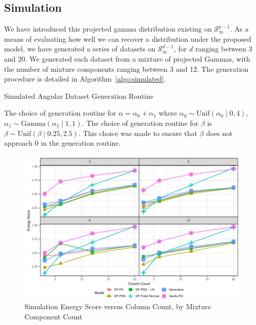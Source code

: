 \subsection{Simulation}
We have introduced this projected gamma distribution existing on $\mathcal{S}_{\infty}^{p-1}$.  As a
  means of evaluating how well we can recover a distribution under the proposed model, we have
  generated a series of datasets on $\mathcal{S}_{\infty}^{d-1}$, for $d$ ranging between 3 and 20.
  We generated each dataset from a mixture of projected Gammas, with the number of mixture components
  ranging between 3 and 12.  The generation procedure is detailed in Algorithm~\ref{algo:simulated}.
  \begin{algorithm}[H]
    \label{algo:simulated}
    \caption{Simulated Angular Dataset Generation Routine}
  \end{algorithm}
  The choice of generation routine for $\alpha = \alpha_0 + \alpha_1$ where
  $\alpha_0 \sim \text{Unif}(\alpha_0\mid 0,4)$, $\alpha_1\sim \text{Gamma}(\alpha_1\mid 1,1)$.
  The choice of generation routine for $\beta$ is $\beta\sim\text{Unif}(\beta\mid 0.25, 2.5)$.
  This choice was made to ensure that $\beta$ does not approach 0 in the generation routine.

\begin{figure}[h]
  \label{fig:simes}
  \caption{Simulation Energy Score versus Column Count, by Mixture Component Count}
  \centering
  \includegraphics{./images/simulation_es}
\end{figure}

